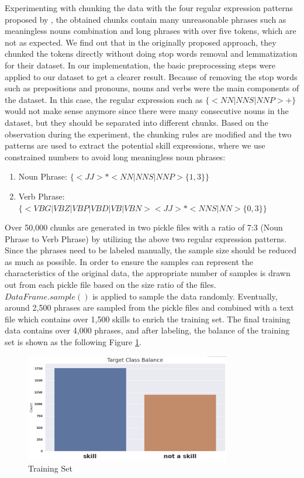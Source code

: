 Experimenting with chunking the data with the four regular expression patterns proposed by \cite{ketterer2}, the obtained chunks contain many unreasonable phrases such as meaningless nouns combination and long phrases with over five tokens, which are not as expected. We find out that in the originally proposed approach, they chunked the tokens directly without doing stop words removal and lemmatization for their dataset. In our implementation, the basic preprocessing steps were applied to our dataset to get a clearer result. Because of removing the stop words such as prepositions and pronouns, nouns and verbs were the main components of the dataset. In this case, the regular expression such as $\{<NN|NNS|NNP>+\}$ would not make sense anymore since there were many consecutive nouns in the dataset, but they should be separated into different chunks. Based on the observation during the experiment, the chunking rules are modified and the two patterns are used to extract the potential skill expressions, where we use constrained numbers to avoid long meaningless noun phrases:

\begin{enumerate}
    \item Noun Phrase: $\{<JJ>*<NN|NNS|NNP>\{1,3\}\}$
    
    \item Verb Phrase: $\{<VBG|VBZ|VBP|VBD|VB|VBN><JJ>*<NNS|NN>\{0,3\}\}$
\end{enumerate}

Over 50,000 chunks are generated in two pickle files with a ratio of 7:3 (Noun Phrase to Verb Phrase) by utilizing the above two regular expression patterns. Since the phrases need to be labeled manually, the sample size should be reduced as much as possible. In order to ensure the samples can represent the characteristics of the original data, the appropriate number of samples is drawn out from each pickle file based on the size ratio of the files. $DataFrame.sample()$ is applied to sample the data randomly. Eventually, around 2,500 phrases are sampled from the pickle files and combined with a text file which contains over 1,500 skills to enrich the training set. The final training data contains over 4,000 phrases, and after labeling, the balance of the training set is shown as the following Figure \ref{fig:32}. 

 \begin{figure}[H]
    \centering
    \includegraphics[width=0.8\textwidth]{images/training_set_balance.png}
    \caption{Training Set}
    \label{fig:32}
\end{figure}


